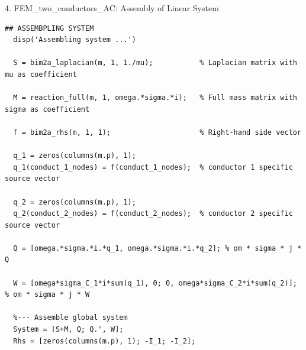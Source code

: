 \documentclass[aspectratio=54,xcolor=dvipsnames]{beamer}
\begin{document}
\begin{frame}[fragile]{4. FEM\_two\_conductors\_AC: Assembly of Linear System}
\scriptsize
\begin{lstlisting}[firstnumber=69]
  ## ASSEMBPLING SYSTEM
  disp('Assembling system ...')

  S = bim2a_laplacian(m, 1, 1./mu);           % Laplacian matrix with mu as coefficient

  M = reaction_full(m, 1, omega.*sigma.*i);   % Full mass matrix with sigma as coefficient

  f = bim2a_rhs(m, 1, 1);                     % Right-hand side vector

  q_1 = zeros(columns(m.p), 1);
  q_1(conduct_1_nodes) = f(conduct_1_nodes);  % conductor 1 specific source vector

  q_2 = zeros(columns(m.p), 1);
  q_2(conduct_2_nodes) = f(conduct_2_nodes);  % conductor 2 specific source vector

  Q = [omega.*sigma.*i.*q_1, omega.*sigma.*i.*q_2]; % om * sigma * j * Q

  W = [omega*sigma_C_1*i*sum(q_1), 0; 0, omega*sigma_C_2*i*sum(q_2)]; % om * sigma * j * W

  %--- Assemble global system
  System = [S+M, Q; Q.', W];
  Rhs = [zeros(columns(m.p), 1); -I_1; -I_2];
  
\end{lstlisting}
\end{frame}
\end{document}
